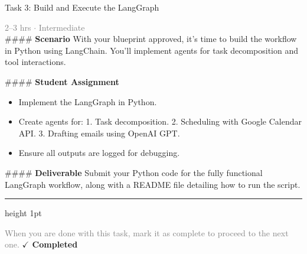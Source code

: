 \documentclass[10pt,a4paper]{article}
\begin{document}
\begin{taskbox}{Task 3: Build and Execute the LangGraph}

    {\small \textcolor{gray}{2--3 hrs $\cdot$ Intermediate}}\\[12pt]

    \#\#\#\# \textbf{Scenario}
With your blueprint approved, it’s time to build the workflow in Python using LangChain. You’ll implement agents for task decomposition and tool interactions.

\#\#\#\# \textbf{Student Assignment}
\begin{itemize}
    \item Implement the LangGraph in Python.
    \item Create agents for:
  1. Task decomposition.
  2. Scheduling with Google Calendar API.
  3. Drafting emails using OpenAI GPT.
    \item Ensure all outputs are logged for debugging.
\end{itemize}

\#\#\#\# \textbf{Deliverable}
Submit your Python code for the fully functional LangGraph workflow, along with a README file detailing how to run the script.\par

    \vspace{16pt}

    \textcolor{cardBorder}{\hrule height 1pt}\vspace{8pt}

    \small \textcolor{gray}{When you are done with this task, mark it as complete to proceed to the next one.} \hfill \textbf{\textcolor{brandDark}{$\checkmark$ Completed}}

\end{taskbox}
\end{document}
